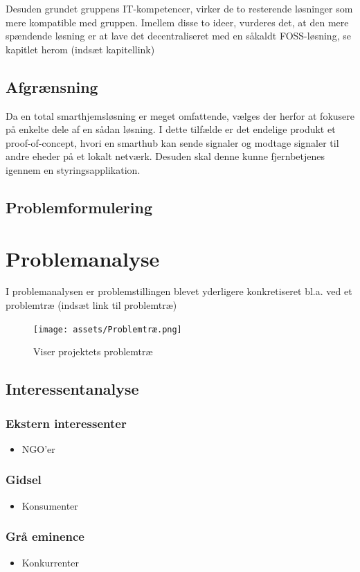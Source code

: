 \documentclass[11pt]{article}
\begin{document}
Desuden grundet gruppens IT-kompetencer, virker de to resterende løsninger som mere kompatible med gruppen. Imellem disse to ideer, vurderes det, at den mere spændende løsning er at lave det decentraliseret med en såkaldt FOSS-løsning, se kapitlet herom (indsæt kapitellink)
\subsection{Afgrænsning}
\label{sec:orgc46d8ef}
Da en total smarthjemsløsning er meget omfattende, vælges der herfor at fokusere på enkelte dele af en sådan løsning. I dette tilfælde er det endelige produkt et proof-of-concept, hvori en smarthub kan sende signaler og modtage signaler til andre eheder på et lokalt netværk. Desuden skal denne kunne fjernbetjenes igennem en styringsapplikation.
\subsection{Problemformulering}
\label{sec:orgef4d52f}
\section{Problemanalyse}
\label{sec:org3679584}

I problemanalysen er problemstillingen blevet yderligere konkretiseret bl.a. ved et problemtræ (indsæt link til problemtræ)
\begin{figure}[htbp]
\centering
\texttt{[image: assets/Problemtræ.png]}
\caption{Viser projektets problemtræ}
\end{figure}
\subsection{Interessentanalyse}
\label{sec:org976cef3}
\subsubsection{Ekstern interessenter}
\label{sec:orgf2dab0a}
\begin{itemize}
\item NGO'er
\end{itemize}
\subsubsection{Gidsel}
\label{sec:org34c7521}
\begin{itemize}
\item Konsumenter
\end{itemize}
\subsubsection{Grå eminence}
\label{sec:orgaa235ac}
\begin{itemize}
\item Konkurrenter
\end{itemize}
\end{document}
